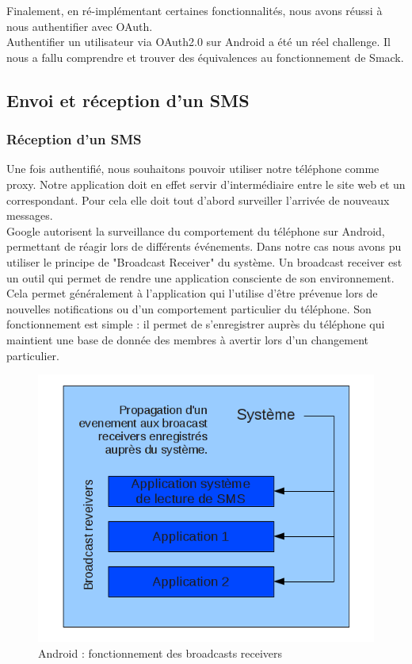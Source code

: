 Finalement, en ré-implémentant certaines fonctionnalités, nous avons réussi à nous authentifier avec OAuth.
\\


Authentifier un utilisateur via OAuth2.0 sur Android a été un réel challenge. Il nous a fallu comprendre 
et trouver des équivalences au fonctionnement de Smack.



\subsection{Envoi et réception d'un SMS}

\subsubsection{Réception d'un SMS}

Une fois authentifié, nous souhaitons pouvoir utiliser notre téléphone comme proxy. Notre application
doit en effet servir d'intermédiaire entre le site web et un correspondant. Pour cela elle doit tout
d'abord surveiller l'arrivée de nouveaux messages. 
\\


Google autorisent la surveillance du comportement du téléphone sur Android, permettant de réagir lors de différents événements.
Dans notre cas nous avons pu utiliser le principe de "Broadcast Receiver" du système. 
Un broadcast receiver est un outil qui permet de rendre une application consciente de son environnement.
Cela permet généralement à l'application qui l'utilise d'être prévenue lors de nouvelles notifications ou 
d'un comportement particulier du téléphone.
Son fonctionnement est simple : il permet de s'enregistrer auprès du téléphone qui maintient une base de donnée des membres à avertir lors d'un changement particulier.

\begin{figure}[!h]
  \center
  \includegraphics[width=12cm]{img/broadcast-receivers.png}
  \caption{Android : fonctionnement des broadcasts receivers}
  \label{broadcast-receivers}
\end{figure}

